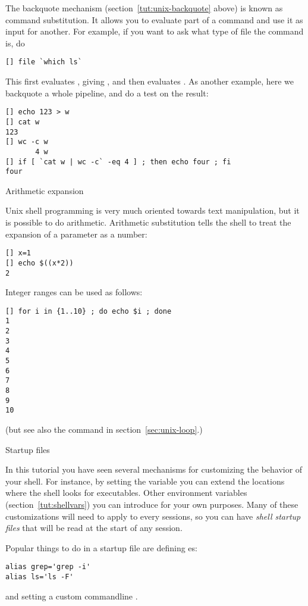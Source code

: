 The backquote mechanism (section~\ref{tut:unix-backquote} above)
is known as command substitution. It allows you to evaluate part
of a command and use it as input for another. For example,
if you want to ask what type of file the command  is, do
\begin{lstlisting}
[] file `which ls`
\end{lstlisting}
This first evaluates , giving , and then
evaluates . As another example, here
we backquote a whole pipeline, and do a test on the result:
\begin{lstlisting}
[] echo 123 > w
[] cat w
123
[] wc -c w
       4 w
[] if [ `cat w | wc -c` -eq 4 ] ; then echo four ; fi
four
\end{lstlisting}

 {Arithmetic expansion}
\label{sec:arith-expansion}

Unix shell programming is very much oriented towards text manipulation, but it 
is possible to do arithmetic. 
Arithmetic substitution tells the shell to treat the expansion of a
parameter as a number:
\begin{lstlisting}
[] x=1
[] echo $((x*2))
2
\end{lstlisting}

Integer ranges can be used as follows:
\begin{lstlisting}
[] for i in {1..10} ; do echo $i ; done
1
2
3
4
5
6
7
8
9
10
\end{lstlisting}
(but see also the  command in section~\ref{sec:unix-loop}.)

 {Startup files}

In this tutorial you have seen several mechanisms for customizing
the behavior of your shell. For instance, by setting the 
variable you can extend the locations where the shell looks for executables.
Other environment variables (section~\ref{tut:shellvars}) you can
introduce for your own purposes. Many of these customizations will
need to apply to every sessions, so you can have 
\emph{shell startup files} that will be read at the start of any session.

Popular things to do in a startup file are defining es:
\begin{lstlisting}
alias grep='grep -i'
alias ls='ls -F'
\end{lstlisting}
and setting a custom commandline .

